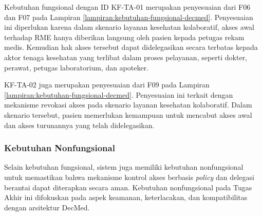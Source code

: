 \documentclass[bahasa, 12pt, a4paper, onecolumn, oneside, final]{report}
\begin{document}
Kebutuhan fungsional dengan ID KF-TA-01 merupakan penyesuaian dari F06 dan F07 pada Lampiran \ref{lampiran:kebutuhan-fungsional-decmed}. Penyesuaian ini diperlukan karena dalam skenario layanan kesehatan kolaboratif, akses awal terhadap RME hanya diberikan langsung oleh pasien kepada petugas rekam medis. Kemudian hak akses tersebut dapat didelegasikan secara terbatas kepada aktor tenaga kesehatan yang terlibat dalam proses pelayanan, seperti dokter, perawat, petugas laboratorium, dan apoteker.

KF-TA-02 juga merupakan penyesuaian dari F09 pada Lampiran \ref{lampiran:kebutuhan-fungsional-decmed}. Penyesuaian ini terkait dengan mekanisme revokasi akses pada skenario layanan kesehatan kolaboratif. Dalam skenario tersebut, pasien memerlukan kemampuan untuk mencabut akses awal dan akses turunannya yang telah didelegasikan.

\subsubsection{Kebutuhan Nonfungsional}
\label{subsubsec:kebutuhan-nonfungsional}

Selain kebutuhan fungsional, sistem juga memiliki kebutuhan nonfungsional untuk memastikan bahwa mekanisme kontrol akses berbasis \textit{policy} dan delegasi berantai dapat diterapkan secara aman. Kebutuhan nonfungsional pada Tugas Akhir ini difokuskan pada aspek keamanan, keterlacakan, dan kompatibilitas dengan arsitektur DecMed.
\end{document}
